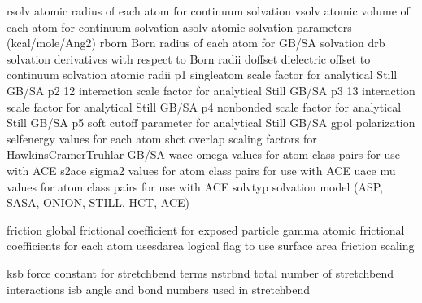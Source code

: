 \documentclass[letterpaper,11pt,english]{sphinxmanual}
\begin{document}

\begin{sphinxVerbatim}[commandchars=\\\{\}]
rsolv           atomic radius of each atom for continuum solvation
vsolv           atomic volume of each atom for continuum solvation
asolv           atomic solvation parameters (kcal/mole/Ang\PYGZca{}2)
rborn           Born radius of each atom for GB/SA solvation
drb             solvation derivatives with respect to Born radii
doffset         dielectric offset to continuum solvation atomic radii
p1              single\PYGZhy{}atom scale factor for analytical Still GB/SA
p2              1\PYGZhy{}2 interaction scale factor for analytical Still GB/SA
p3              1\PYGZhy{}3 interaction scale factor for analytical Still GB/SA
p4              nonbonded scale factor for analytical Still GB/SA
p5              soft cutoff parameter for analytical Still GB/SA
gpol            polarization self\PYGZhy{}energy values for each atom
shct            overlap scaling factors for Hawkins\PYGZhy{}Cramer\PYGZhy{}Truhlar GB/SA
wace            \PYGZdq{}omega\PYGZdq{} values for atom class pairs for use with ACE
s2ace           \PYGZdq{}sigma\PYGZca{}2\PYGZdq{} values for atom class pairs for use with ACE
uace            \PYGZdq{}mu\PYGZdq{} values for atom class pairs for use with ACE
solvtyp         solvation model (ASP, SASA, ONION, STILL, HCT, ACE)
\end{sphinxVerbatim}


\begin{sphinxVerbatim}[commandchars=\\\{\}]
friction        global frictional coefficient for exposed particle
gamma           atomic frictional coefficients for each atom
use\PYGZus{}sdarea      logical flag to use surface area friction scaling
\end{sphinxVerbatim}


\begin{sphinxVerbatim}[commandchars=\\\{\}]
ksb             force constant for stretch\PYGZhy{}bend terms
nstrbnd         total number of stretch\PYGZhy{}bend interactions
isb             angle and bond numbers used in stretch\PYGZhy{}bend
\end{sphinxVerbatim}
\end{document}

